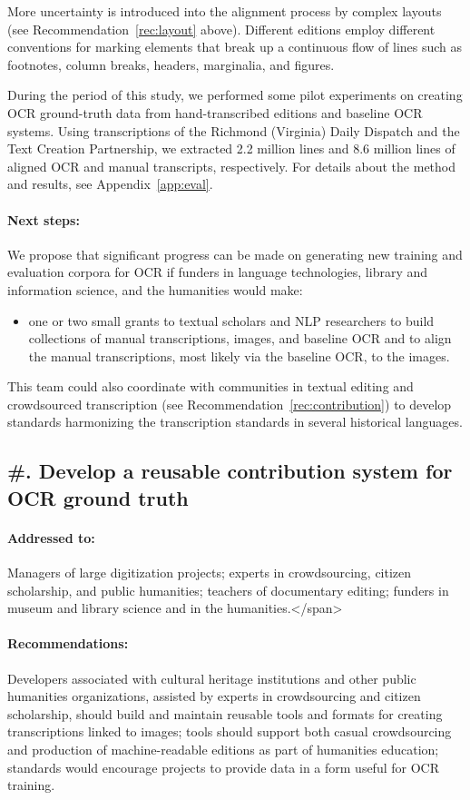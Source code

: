 \documentclass[twoside,11pt]{report}
\newcounter{reccounter}
\renewcommand{\thereccounter}{\arabic{reccounter}}
\newcommand{\recommend}[2]{\refstepcounter{reccounter}%
  \label{rec:#1}%
  \subsection{\#\thereccounter. #2}%
  \label{sec:rec-#1}}
\begin{document}
More uncertainty is introduced into the alignment process by complex layouts (see Recommendation~\ref{rec:layout} above). Different editions employ different conventions for marking elements that break up a continuous flow of lines such as footnotes, column breaks, headers, marginalia, and figures.

During the period of this study, we performed some pilot experiments on creating OCR ground-truth data from hand-transcribed editions and baseline OCR systems. Using transcriptions of the Richmond (Virginia) Daily Dispatch and the Text Creation Partnership, we extracted 2.2 million lines and 8.6 million lines of aligned OCR and manual transcripts, respectively. For details about the method and results, see Appendix~\ref{app:eval}.

\paragraph{Next steps:} We propose that significant progress can be made on generating new training and evaluation corpora for OCR if funders in language technologies, library and information science, and the humanities would make:
\begin{itemize}

\item one or two small grants to textual scholars and NLP researchers to build collections of manual transcriptions, images, and baseline OCR and to align the manual transcriptions, most likely via the baseline OCR, to the images.
  
\end{itemize}

This team could also coordinate with communities in textual editing and crowdsourced transcription (see Recommendation~\ref{rec:contribution}) to develop standards harmonizing the transcription standards in several historical languages.

\recommend{contribution}{Develop a reusable contribution system for OCR ground truth}

\paragraph{Addressed to:} Managers of large digitization projects; experts in crowdsourcing, citizen scholarship, and public humanities; teachers of documentary editing; funders in museum and library science and in the humanities.</span>

\paragraph{Recommendations:} Developers associated with cultural heritage institutions and other public humanities organizations, assisted by experts in crowdsourcing and citizen scholarship, should build and maintain reusable tools and formats for creating transcriptions linked to images; tools should support both casual crowdsourcing and production of machine-readable editions as part of humanities education; standards would encourage projects to provide data in a form useful for OCR training.
\end{document}
